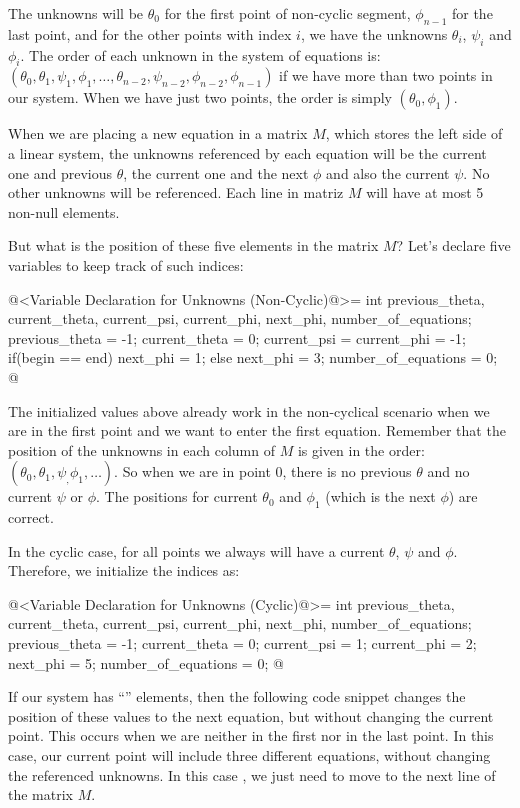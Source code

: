 The unknowns will be $\theta_0$ for the first point of non-cyclic
segment, $\phi_{n-1}$ for the last point, and for the other points
with index $i$, we have the unknowns $\theta_i$, $\psi_i$ and
$\phi_i$. The order of each unknown in the system of equations is:
$(\theta_0, \theta_1, \psi_1, \phi_1, \ldots, \theta_{n-2}, \psi_{n-2}, \phi_{n-2}, \phi_{n-1})$
if we have more than two points in our system. When we have just two points, the order is simply $(\theta_0, \phi_1)$.

When we are placing a new equation in a matrix $M$, which stores the
left side of a linear system, the unknowns referenced by each equation
will be the current one and previous $\theta$, the current one and the
next $\phi$ and also the current $\psi$. No other unknowns will be
referenced. Each line in matriz $M$ will have at most 5 non-null
elements.

But what is the position of these five elements in the matrix $M$?
Let's declare five variables to keep track of such indices:

\iniciocodigo
@<Variable Declaration for Unknowns (Non-Cyclic)@>=
int previous_theta, current_theta, current_psi, current_phi, next_phi,
    number_of_equations;
previous_theta = -1;
current_theta = 0;
current_psi = current_phi = -1;
if(begin == end)
  next_phi = 1;
else
  next_phi = 3;
number_of_equations = 0;
@
\fimcodigo

The initialized values ​​above already work in the non-cyclical
scenario when we are in the first point and we want to enter the first
equation. Remember that the position of the unknowns in each column of
$M$ is given in the order:
$(\theta_0, \theta_1, \psi_, \phi_1, \ldots)$. So when we are in point
0, there is no previous $\theta$ and no current $\psi$ or $\phi$. The
positions for current $\theta_0$ and $\phi_1$ (which is the next
$\phi$) are correct.

In the cyclic case, for all points we always will have a current
$\theta$, $\psi$ and $\phi$. Therefore, we initialize the indices as:

\iniciocodigo
@<Variable Declaration for Unknowns (Cyclic)@>=
int previous_theta, current_theta, current_psi, current_phi, next_phi,
    number_of_equations;
previous_theta = -1;
current_theta = 0;
current_psi = 1;
current_phi = 2;
next_phi = 5;
number_of_equations = 0;
@
\fimcodigo

If our system has ``'' elements, then the following
code snippet changes the position of these values to the next
equation, but without changing the current point. This occurs when we
are neither in the first nor in the last point. In this case, our
current point will include three different equations, without changing
the referenced unknowns. In this case , we just need to move to the
next line of the matrix $M$.

